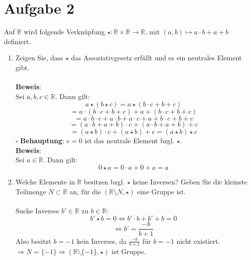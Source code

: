 \documentclass[11pt,a4paper,ngerman]{article}
\newcommand{\R}{\mathbb{R}}
\begin{document}
\section*{Aufgabe 2}

Auf $\R$ wird folgende Verknüpfung $\star : \R \times \R \to \R$, mit $(a,b) \mapsto a \cdot b + a + b$ definiert.

\begin{enumerate}[\bfseries a)]

\item Zeigen Sie, dass $\star$ das Assoziativgesetz erfüllt und es ein neutrales Element gibt.
\\ \\
\textbf{Beweis}: \\
Sei $a,b,c \in \R$. Dann gilt: \\
$$ a \star (b \star c) = a \star (b \cdot c + b +c) $$
$$ = a \cdot (b \cdot c + b + c) + a + (b \cdot c + b + c) $$
$$ = a \cdot b \cdot c + a \cdot b + a \cdot c + a + b \cdot c + b +c $$
$$ = (a \cdot b + a + b) \cdot c + (a \cdot b +a + b)+c $$
$$ = (a \star b) \cdot c + (a \star b) + c = (a \star b) \star c $$
\mbox{} \hfill $\square$
\newpage
\textbf{Behauptung}: $e = 0$ ist das neutrale Element bzgl. $\star$. \\
\textbf{Beweis}: \\
Sei $a \in \R$. Dann gilt: \\
$$ 0 \star a = 0 \cdot a + 0 + a = a $$
\item Welche Elemente in $\R$ besitzen bzgl. $\star$ keine Inversen? Geben Sie die kleinste Teilmenge $N \subset \R$ an, für die $(\R \setminus N,\star)$ eine Gruppe ist.
\\ \\
Suche Inverses $b' \in \R$ zu $b \in \R$: \\
$$ b' \star b = 0 \Leftrightarrow b' \cdot b + b' + b = 0 $$
$$ \Leftrightarrow b' = \frac{-b}{b+1} $$
Also besitzt $b = -1$ kein Inverses, da $\frac{-b}{b+1}$ für $b = -1$ nicht existiert. \\
$ \Rightarrow N = \{-1\} \Rightarrow (\R \setminus \{-1\}, \star)$ ist Gruppe.
\end{enumerate}
\end{document}

